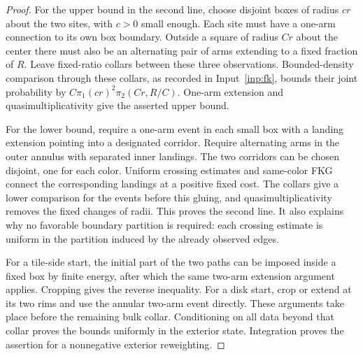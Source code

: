\begin{proof}
For the upper bound in the second line, choose disjoint boxes of radius
$c r$ about the two sites, with $c>0$ small enough.  Each site must have
a one-arm connection to its own box boundary.  Outside a square of
radius $C r$ about the center there must also be an alternating pair
of arms extending to a fixed fraction of $R$.  Leave fixed-ratio
collars between these three observations.  Bounded-density comparison
through these collars, as recorded in Input~\ref{inp:fk}, bounds their
joint probability by
$C\pi_1(c r)^2\pi_2(C r,R/C)$.  One-arm extension and
quasimultiplicativity give the asserted upper bound.

For the lower bound, require a one-arm event in each small box with a
landing extension pointing into a designated corridor.  Require
alternating arms in the outer annulus with separated inner landings.
The two corridors can be chosen disjoint, one for each color.  Uniform
crossing estimates and same-color FKG connect the corresponding
landings at a positive fixed cost.  The collars give a lower comparison
for the events before this gluing, and quasimultiplicativity removes
the fixed changes of radii.  This proves the second line.  It also
explains why no favorable boundary partition is required: each
crossing estimate is uniform in the partition induced by the already
observed edges.

For a tile-side start, the initial part of the two paths can be imposed
inside a fixed box by finite energy, after which the same two-arm
extension argument applies.  Cropping gives the reverse inequality.
For a disk start, crop or extend at its two rims and use the annular
two-arm event directly.  These arguments take place before the
remaining bulk collar.  Conditioning on all data beyond that collar
proves the bounds uniformly in the exterior state.  Integration proves
the assertion for a nonnegative exterior reweighting.
\end{proof}

